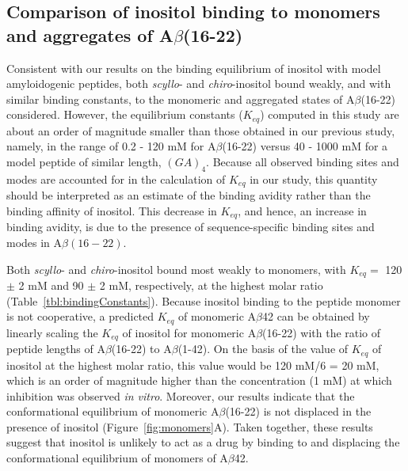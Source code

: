 \subsection{Comparison of inositol binding to monomers and aggregates of A$\beta$(16-22)}
Consistent with our results on the binding equilibrium of inositol with model amyloidogenic peptides,\cite{Li:2012p853} both \emph{scyllo}- and \emph{chiro}-inositol bound weakly, and with similar binding constants, to the monomeric and aggregated states of A$\beta$(16-22) considered. %
However, the equilibrium constants ($K_{eq}$) computed in this study are about an order of magnitude smaller than those obtained in our previous study, namely, in the range of 0.2 - 120 mM for A$\beta$(16-22) versus 40 - 1000 mM for a model peptide of similar length, $(GA)_4$.\cite{Li:2012p853} Because all observed binding sites and modes are accounted for in the calculation of $K_{eq}$ in our study, this quantity should be interpreted as an estimate of the binding avidity rather than the binding affinity of inositol.  This decrease in $K_{eq}$, and hence, an increase in binding avidity, is due to the presence of sequence-specific binding sites and modes in A$\beta(16-22)$.

Both \emph{scyllo}- and \emph{chiro}-inositol bound most weakly to monomers, with $K_{eq}=$ 120 $\pm$ 2 mM and 90 $\pm$ 2 mM, respectively, at the highest molar ratio (Table~\ref{tbl:bindingConstants}). Because inositol binding to the peptide monomer is not cooperative, a predicted $K_{eq}$ of monomeric A$\beta$42 can be obtained by linearly scaling the $K_{eq}$ of inositol for monomeric A$\beta$(16-22) with the ratio of peptide lengths of A$\beta$(16-22) to A$\beta$(1-42).  On the basis of the value of $K_{eq}$ of inositol at the highest molar ratio, this value would be 120 mM/6 = 20 mM, which is an order of magnitude higher than the concentration (1 mM) at which inhibition was observed \emph{in vitro}.\cite{McLaurin:2000p64}  Moreover, our results indicate that the conformational equilibrium of monomeric A$\beta$(16-22) is not displaced in the presence of inositol (Figure~\ref{fig:monomers}A). Taken together, these results suggest that inositol is unlikely to act as a drug by binding to and displacing the conformational equilibrium of monomers of A$\beta$42.

